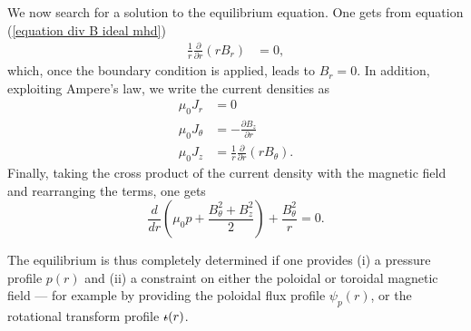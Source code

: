 \documentclass[my_thesis.tex]{subfiles}
\begin{document}
We now search for a solution to the equilibrium equation. One gets from equation (\ref{equation div B ideal mhd})
\begin{align}
\frac{1}{r}\frac{\partial}{\partial r}(r B_r) &= 0, 
\end{align}
which, once the boundary condition is applied, leads to $B_r=0$. In addition, exploiting Ampere's law, we write the current densities as
\begin{align}
	\mu_0J_r &= 0\\
	\mu_0J_\theta &= -\frac{\partial B_z}{\partial r}\\
	\mu_0J_z &= \frac{1}{r}\frac{\partial}{\partial r}(rB_\theta).
\end{align} 
Finally, taking the cross product of the current density with the magnetic field and rearranging the terms, one gets
\begin{equation}
	\frac{d}{dr}\left(\mu_0p + \frac{B_\theta^2 + B_z^2}{2}\right) + \frac{B_\theta^2}{r} = 0.
\end{equation}

The equilibrium is thus completely determined if one provides (i) a pressure profile $p(r)$ and (ii) a constraint on either the poloidal or toroidal magnetic field --- for example by providing the poloidal flux profile $\psi_p(r)$, or the rotational transform profile $\text{$\iota\!\!$-}(r)$.


\end{document}
